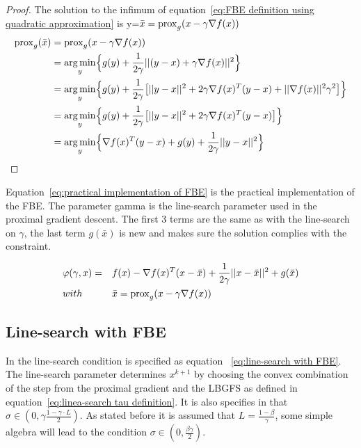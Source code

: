 		\begin{proof}
			The solution to the infimum of equation~\ref{eq:FBE definition using quadratic approximation} is y=$\bar{x}= \operatorname{prox}_g(x-\gamma \nabla f(x))$
			\begin{align*}
			\operatorname{prox}_g(\bar{x}) 
			&=\operatorname{prox}_g(x- \gamma \nabla f(x)) \\
			&= \underset{y}{\operatorname*{arg\,min}} \Big \{ g(y) 
			+ \frac{1}{2 \gamma}||(y-x) + \gamma \nabla f(x)||^2 \Big \} \\
			&= \underset{y}{\operatorname*{arg\,min}} \Big \{ g(y) 
			+ \frac{1}{2 \gamma} \big[||y-x||^2 + 2 \gamma \nabla f(x)^T(y-x) + ||\nabla f(x)||^2\gamma^2 \big] \Big \} \\
			&= \underset{y}{\operatorname*{arg\,min}} \Big \{ g(y) 
			+ \frac{1}{2 \gamma} \big[||y-x||^2 + 2 \gamma \nabla f(x)^T(y-x)  \big] \Big \}\\
			&= \underset{y}{\operatorname*{arg\,min}} \Big \{   \nabla f(x)^T(y-x)  + g(y) 
			+ \frac{1}{2 \gamma} ||y-x||^2  \Big  \}
			\end{align*}
			\label{prf:prox is solution to FBE inf}
		\end{proof}
		
		Equation~\ref{eq:practical implementation of FBE} is the practical implementation of the FBE. The parameter gamma is the line-search parameter used in the proximal gradient descent. The first 3 terms are the same as with the line-search on $\gamma$, the last term $g(\bar{x})$ is new and makes sure the solution complies with the constraint.
		
%		
		\begin{equation}
			\begin{aligned}	
				& \varphi(\gamma,x)= 
				&& f(x) - \nabla f(x)^T(x-\bar{x}) + \frac{1}{2 \gamma}||x-\bar{x}||^2  + g(\bar{x})
				\\
				& with 
				&&\bar{x} = \operatorname{prox}_g( x - \gamma\nabla f(x)) 
			\end{aligned} 
			\label{eq:practical implementation of FBE}
		\end{equation}
		
	
	\subsection{Line-search with FBE}
	In \cite{LorenzoStella2017} the line-search condition is specified as equation ~\ref{eq:line-search with FBE}. The line-search parameter determines $x^{k+1}$ by choosing the convex combination of the step from the proximal gradient and the LBGFS as defined in equation~\ref{eq:linea-search tau definition}. It is also specifies in \cite{LorenzoStella2017} that $\sigma \in (0, \gamma \frac{1-\gamma\cdot L}{2})$. As stated before it is assumed that $L=\frac{1-\beta}{\gamma}$, some simple algebra will lead to the condition $\sigma \in (0,\frac{\beta \gamma}{2})$.
	
